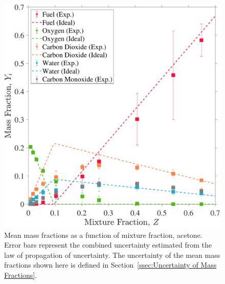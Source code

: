 \documentclass[12pt]{article}
\begin{document}
\begin{figure}[!]
	\centering
\includegraphics[width=\textwidth,keepaspectratio]{Adjusted_FuelAcetone_Mixture_Fraction_Intermediate_Plot.pdf}
	\caption[Mean mass fractions as a function of mixture fraction, acetone]{Mean mass fractions as a function of mixture fraction, acetone. Error bars represent the combined uncertainty estimated from the law of propagation of uncertainty. The uncertainty of the mean mass fractions shown here is defined in Section~\ref{ssec:Uncertainty of Mass Fractions}.}
	\label{fig:Acetone_Mix_Frac}
\end{figure}
\end{document}
